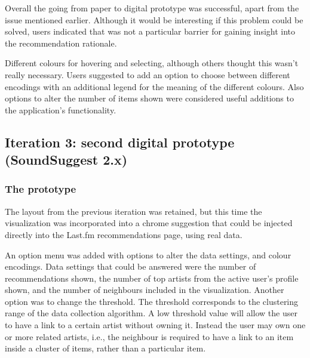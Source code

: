 
Overall the going from paper to digital prototype was successful, apart from the issue mentioned earlier. Although it would be interesting if this problem could be solved, users indicated that was not a particular barrier for gaining insight into the recommendation rationale.

Different colours for hovering and selecting, although others thought this wasn't really necessary. Users suggested to add an option to choose between different encodings with an additional legend for the meaning of the different colours. Also options to alter the number of items shown were considered useful additions to the application's functionality.


\subsection{Iteration 3: second digital prototype (SoundSuggest 2.x)}\label{chapter:prototype:section:soundsuggest2}

\subsubsection{The prototype}\label{chapter:prototype:section:soundsuggest2:prototype}

The layout from the previous iteration was retained, but this time the visualization was incorporated into a chrome suggestion that could be injected directly into the Last.fm recommendations page, using real data.

An option menu was added with options to alter the data settings, and colour encodings. Data settings that could be answered were the number of recommendations shown, the number of top artists from the active user's profile shown, and the number of neighbours included in the visualization. Another option was to change the threshold. The threshold corresponds to the clustering range of the data collection algorithm. A low threshold value will allow the user to have a link to a certain artist without owning it. Instead the user may own one or more related artists, i.e., the neighbour is required to have a link to an item inside a cluster of items, rather than a particular item.

